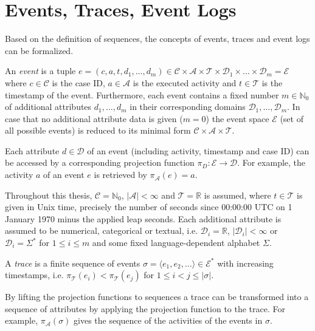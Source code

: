 \section{Events, Traces, Event Logs}

Based on the definition of sequences, the concepts of events, traces and event logs can be formalized.

\begin{definition}[Event]
An  \textit{event} is a tuple $e = (c,a,t,d_1,\dots, d_m) \in \mathcal{C} \times \mathcal{A}  \times \mathcal{T} \times \mathcal{D}_1 \times \dots \times \mathcal{D}_m =  \mathcal{E}$ where  $c \in \mathcal{C} $ is the case ID, $a \in \mathcal{A}$ is the executed activity and $t \in \mathcal{T}$ is the timestamp of the event.
Furthermore, each event contains a fixed number $m \in \mathbb{N}_0$ of additional attributes $d_1, \dots, d_m$ in their corresponding domains $\mathcal{D}_1, \dots , \mathcal{D}_m$.
In case that no additional attribute data is given ($m = 0$) the event space $\mathcal{E}$ (set of all possible events) is reduced to its minimal form $\mathcal{C} \times \mathcal{A}  \times \mathcal{T}$.
\end{definition}

Each attribute $d \in \mathcal{D}$ of an event (including activity, timestamp and case ID) can be accessed by a corresponding projection function $\pi_D \colon \mathcal{E} \to \mathcal{D}$.
For example, the activity $a$ of an event $e$ is retrieved by $\pi_\mathcal{A}(e) = a$.

Throughout this thesis,  $\mathcal{C} = \mathbb{N}_0$, $|\mathcal{A}| < \infty$ and $ \mathcal{T} = \mathbb{R}$ is assumed, where $t \in \mathcal{T}$ is given in Unix time, precisely the number of seconds since 00:00:00 UTC on 1 January 1970 minus the applied leap seconds.
Each additional attribute is assumed to be numerical, categorical or textual, i.e. $\mathcal{D}_i = \mathbb{R}$, $|\mathcal{D}_i| < \infty$ or $\mathcal{D}_i = \Sigma^\ast$  for $1 \leq i \leq m$ and some fixed language-dependent alphabet $\Sigma$.

\begin{definition}[Trace]
	A \textit{trace} is a finite sequence of events $\sigma = \langle e_1, e_2, \dots\rangle \in  \mathcal{E}^\ast$ with increasing timestamps, i.e. $\pi_\mathcal{T} (e_i) < \pi_\mathcal{T} (e_j) $ for $1 \leq i < j \leq |\sigma|$.
\end{definition}


By lifting the projection functions to sequences a trace can be transformed into a sequence of attributes by applying the projection function to the trace.
For example, $\pi_\mathcal{A}(\sigma)$ gives the sequence of the activities of the events in $\sigma$.


